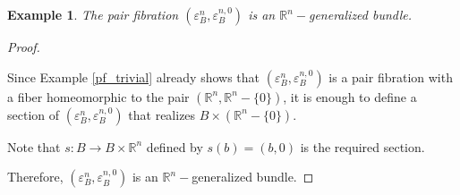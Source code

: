 \documentclass[12pt,oneside]{book}
\newtheorem{ex}     {Example}[chapter]
\newcommand{\R}{\mathbb{R}}
\begin{document}
    \begin{ex}\label{fht_trivial}
        The pair fibration $(\varepsilon^{n}_{B},\varepsilon^{n,0}_{B})$ is an $\R^{n}-$generalized bundle.
    \end{ex}
    \begin{proof}
        
        \
    
        Since Example \ref{pf_trivial} already shows that $(\varepsilon^{n}_{B},\varepsilon^{n,0}_{B})$ is a pair fibration with a fiber 
        homeomorphic to the pair $(\R^{n},\R^{n}-\{ 0 \})$, it is enough to define a section of $(\varepsilon^{n}_{B},\varepsilon^{n,0}_{B})$ 
        that realizes $B\times(\R^{n}-\{ 0 \})$.
    
        Note that $s:B\to B\times\R^{n}$ defined by $s(b)=(b,0)$ is the required section.
    
        Therefore, $(\varepsilon^{n}_{B},\varepsilon^{n,0}_{B})$ is an $\R^{n}-$generalized bundle.
    
    \end{proof}
    
\end{document}
